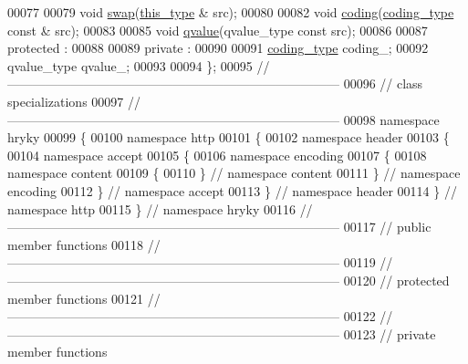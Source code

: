 \begin{DoxyCode}
00077 
00079     \textcolor{keywordtype}{void} \hyperlink{classhryky_1_1http_1_1header_1_1accept_1_1encoding_1_1content_1_1_entity_af6a6b0851cfd77c844793d8d7f6706fb}{swap}(\hyperlink{classhryky_1_1http_1_1header_1_1accept_1_1encoding_1_1content_1_1_entity}{this_type} & src);
00080 
00082     \textcolor{keywordtype}{void} \hyperlink{classhryky_1_1http_1_1header_1_1accept_1_1encoding_1_1content_1_1_entity_afd81fac9a88a9383606217efc4b1397d}{coding}(\hyperlink{classhryky_1_1_vector}{coding_type} \textcolor{keyword}{const} & src);
00083 
00085     \textcolor{keywordtype}{void} \hyperlink{classhryky_1_1http_1_1header_1_1accept_1_1encoding_1_1content_1_1_entity_a776c65f7f19fac48188a4b3a43a00e8f}{qvalue}(qvalue\_type \textcolor{keyword}{const} src);
00086 
00087 \textcolor{keyword}{protected} :
00088 
00089 \textcolor{keyword}{private} :
00090 
00091     \hyperlink{classhryky_1_1_vector}{coding_type} coding\_;
00092     qvalue\_type qvalue\_;
00093 
00094 \};
00095 \textcolor{comment}{//
      ------------------------------------------------------------------------------}
00096 \textcolor{comment}{// class specializations}
00097 \textcolor{comment}{//
      ------------------------------------------------------------------------------}
00098 \textcolor{keyword}{namespace }hryky
00099 \{
00100 \textcolor{keyword}{namespace }http
00101 \{
00102 \textcolor{keyword}{namespace }header
00103 \{
00104 \textcolor{keyword}{namespace }accept
00105 \{
00106 \textcolor{keyword}{namespace }encoding
00107 \{
00108 \textcolor{keyword}{namespace }content
00109 \{
00110 \} \textcolor{comment}{// namespace content}
00111 \} \textcolor{comment}{// namespace encoding}
00112 \} \textcolor{comment}{// namespace accept}
00113 \} \textcolor{comment}{// namespace header}
00114 \} \textcolor{comment}{// namespace http}
00115 \} \textcolor{comment}{// namespace hryky}
00116 \textcolor{comment}{//
      ------------------------------------------------------------------------------}
00117 \textcolor{comment}{// public member functions}
00118 \textcolor{comment}{//
      ------------------------------------------------------------------------------}
00119 \textcolor{comment}{//
      ------------------------------------------------------------------------------}
00120 \textcolor{comment}{// protected member functions}
00121 \textcolor{comment}{//
      ------------------------------------------------------------------------------}
00122 \textcolor{comment}{//
      ------------------------------------------------------------------------------}
00123 \textcolor{comment}{// private member functions}

\end{DoxyCode}
